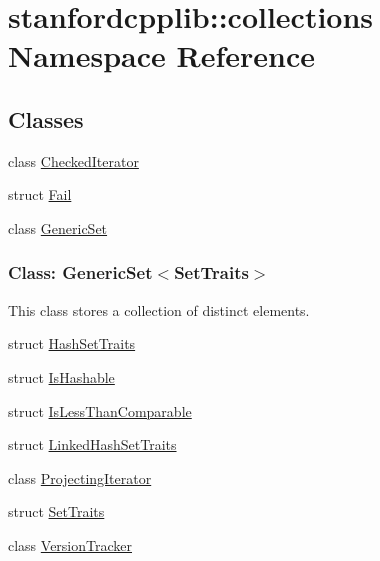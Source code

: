 \hypertarget{namespacestanfordcpplib_1_1collections}{}\section{stanfordcpplib\+:\+:collections Namespace Reference}
\label{namespacestanfordcpplib_1_1collections}
\subsection*{Classes}
\begin{DoxyCompactItemize}
\item 
class \mbox{\hyperlink{classstanfordcpplib_1_1collections_1_1CheckedIterator}{Checked\+Iterator}}
\item 
struct \mbox{\hyperlink{structstanfordcpplib_1_1collections_1_1Fail}{Fail}}
\item 
class \mbox{\hyperlink{classstanfordcpplib_1_1collections_1_1GenericSet}{Generic\+Set}}
\begin{DoxyCompactList}\small\item\em \subsubsection*{Class\+: Generic\+Set$<$\+Set\+Traits$>$ }

This class stores a collection of distinct elements. \end{DoxyCompactList}\item 
struct \mbox{\hyperlink{structstanfordcpplib_1_1collections_1_1HashSetTraits}{Hash\+Set\+Traits}}
\item 
struct \mbox{\hyperlink{structstanfordcpplib_1_1collections_1_1IsHashable}{Is\+Hashable}}
\item 
struct \mbox{\hyperlink{structstanfordcpplib_1_1collections_1_1IsLessThanComparable}{Is\+Less\+Than\+Comparable}}
\item 
struct \mbox{\hyperlink{structstanfordcpplib_1_1collections_1_1LinkedHashSetTraits}{Linked\+Hash\+Set\+Traits}}
\item 
class \mbox{\hyperlink{classstanfordcpplib_1_1collections_1_1ProjectingIterator}{Projecting\+Iterator}}
\item 
struct \mbox{\hyperlink{structstanfordcpplib_1_1collections_1_1SetTraits}{Set\+Traits}}
\item 
class \mbox{\hyperlink{classstanfordcpplib_1_1collections_1_1VersionTracker}{Version\+Tracker}}
\end{DoxyCompactItemize}
